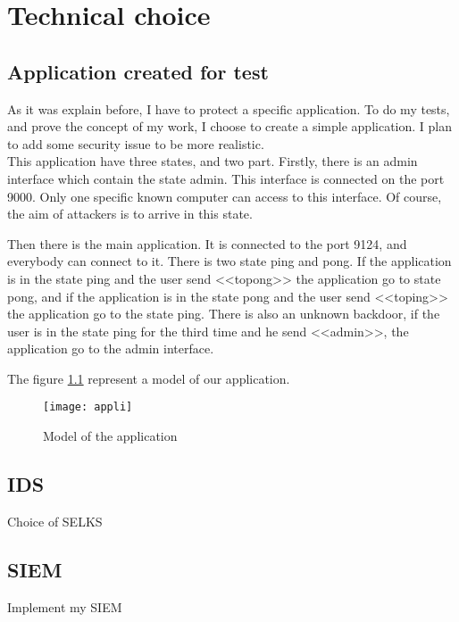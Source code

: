 
\chapter{Technical choice}



\section{Application created for test}

As it was explain before, I have to protect a specific application. To do my tests, and prove the concept of my
work, I choose to create a simple application. I plan to add some security issue to be more realistic.~\\


This application have three states, and two part. Firstly, there is an admin interface which contain the state
admin. This interface is connected on the port 9000. Only one specific known computer can access to this interface.
Of course, the aim of attackers is to arrive in this state.

Then there is the main application. It is connected to the port 9124, and everybody can connect to it. There is two
state ping and pong. If the application is in the state ping and the user send <<topong>> the application go to state
pong, and if the application is in the state pong and the user send <<toping>> the application go to the state ping.
There is also an unknown backdoor, if the user is in the state ping for the third time and he send <<admin>>, the
application go to the admin interface.

The figure \ref{fig:appli} represent a model of our application.


\begin{figure}[!h]
  \centering
  \texttt{[image: appli]}
  \caption{Model of the application}
  \label{fig:appli}
\end{figure}

\section{IDS}

Choice of SELKS

\section{SIEM}

Implement my SIEM



